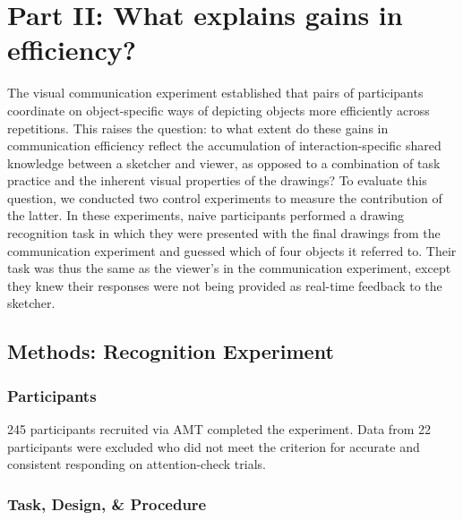 \documentclass[10pt,letterpaper]{article}
\begin{document}

\section{Part II: What explains gains in efficiency?}

The visual communication experiment established that pairs of participants coordinate on object-specific ways of depicting objects more efficiently across repetitions.
This raises the question: to what extent do these gains in communication efficiency reflect the accumulation of interaction-specific shared knowledge between a sketcher and viewer, as opposed to a combination of task practice and the inherent visual properties of the drawings?
To evaluate this question, we conducted two control experiments to measure the contribution of the latter.
In these experiments, naive participants performed a drawing recognition task in which they were presented with the final drawings from the communication experiment and guessed which of four objects it referred to.
Their task was thus the same as the viewer's in the communication experiment, except they knew their responses were not being provided as real-time feedback to the sketcher.


\subsection{Methods: Recognition Experiment}

\subsubsection{Participants}

245 participants recruited via AMT completed the experiment. Data from 22 participants were excluded who did not meet the criterion for accurate and consistent responding on attention-check trials.

\subsubsection{Task, Design, \& Procedure}
\end{document}
